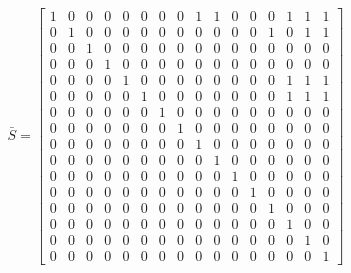 \documentclass[12pt, a4paper]{report}
\begin{document}
\begin{appendices}
\begin{equation}
\label{mat:Logical S}
\bar{S}=
    \begin{bmatrix}
    1 & 0 & 0 & 0 & 0 & 0 & 0 & 0 & 1 & 1 & 0 & 0 & 0 & 1 & 1 & 1 \\
    0 & 1 & 0 & 0 & 0 & 0 & 0 & 0 & 0 & 0 & 0 & 0 & 1 & 0 & 1 & 1 \\
    0 & 0 & 1 & 0 & 0 & 0 & 0 & 0 & 0 & 0 & 0 & 0 & 0 & 0 & 0 & 0 \\
    0 & 0 & 0 & 1 & 0 & 0 & 0 & 0 & 0 & 0 & 0 & 0 & 0 & 0 & 0 & 0 \\
    0 & 0 & 0 & 0 & 1 & 0 & 0 & 0 & 0 & 0 & 0 & 0 & 0 & 1 & 1 & 1 \\
    0 & 0 & 0 & 0 & 0 & 1 & 0 & 0 & 0 & 0 & 0 & 0 & 0 & 1 & 1 & 1 \\
    0 & 0 & 0 & 0 & 0 & 0 & 1 & 0 & 0 & 0 & 0 & 0 & 0 & 0 & 0 & 0 \\
    0 & 0 & 0 & 0 & 0 & 0 & 0 & 1 & 0 & 0 & 0 & 0 & 0 & 0 & 0 & 0 \\
    0 & 0 & 0 & 0 & 0 & 0 & 0 & 0 & 1 & 0 & 0 & 0 & 0 & 0 & 0 & 0 \\
    0 & 0 & 0 & 0 & 0 & 0 & 0 & 0 & 0 & 1 & 0 & 0 & 0 & 0 & 0 & 0 \\
    0 & 0 & 0 & 0 & 0 & 0 & 0 & 0 & 0 & 0 & 1 & 0 & 0 & 0 & 0 & 0 \\
    0 & 0 & 0 & 0 & 0 & 0 & 0 & 0 & 0 & 0 & 0 & 1 & 0 & 0 & 0 & 0 \\
    0 & 0 & 0 & 0 & 0 & 0 & 0 & 0 & 0 & 0 & 0 & 0 & 1 & 0 & 0 & 0 \\
    0 & 0 & 0 & 0 & 0 & 0 & 0 & 0 & 0 & 0 & 0 & 0 & 0 & 1 & 0 & 0 \\
    0 & 0 & 0 & 0 & 0 & 0 & 0 & 0 & 0 & 0 & 0 & 0 & 0 & 0 & 1 & 0 \\
    0 & 0 & 0 & 0 & 0 & 0 & 0 & 0 & 0 & 0 & 0 & 0 & 0 & 0 & 0 & 1
    \end{bmatrix}
\end{equation}


\end{appendices}
\end{document}

